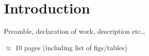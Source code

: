 \section{Introduction}
\label{introduction}

Preamble, declaration of work, description etc\ldots

$\approx$ 10 pages (including list of figs/tables)



